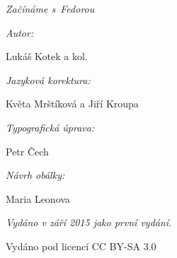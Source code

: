 \newpage\mbox{}\newpage
\begin{center}

{\it\large Začínáme s~Fedorou}

\bigskip

{\it Autor:}

Lukáš Kotek a kol.

{\it Jazyková korektura:}

Květa Mrštíková a Jiří Kroupa

{\it Typografická úprava:}

Petr Čech

{\it Návrh obálky:}

Maria Leonova

{\it Vydáno v září 2015 jako první vydání.

Vydáno pod licencí CC BY-SA 3.0}
\end{center}
